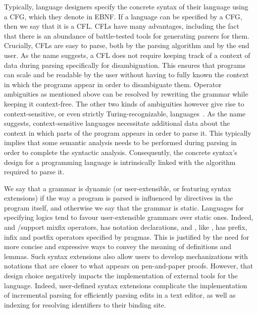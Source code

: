 

Typically, language designers specify the concrete syntax of their language using a \ac{CFG}, which they denote in \ac{EBNF}.
If a language can be specified by a \ac{CFG}, then we say that it is a \ac{CFL}.
\Acp{CFL} have many advantages, including the fact that there is an abundance of battle-tested tools for generating parsers for them.
Crucially, \acp{CFL} are easy to parse, both by the parsing algorithm and by the end user.
As the name suggests, a \ac{CFL} does not require keeping track of a context of data during parsing specifically for disambiguation.
This ensures that programs can scale and be readable by the user without having to fully known the context in which the programs appear in order to disambiguate them.
Operator ambiguities as mentioned above can be resolved by rewriting the grammar while keeping it context-free.
The other two kinds of ambiguities however give rise to context-sensitive, or even strictly Turing-recognizable, languages~\cite{chomsky1956three}.
As the name suggests, context-sensitive languages necessitate additional data about the context in which parts of the program appears in order to parse it.
This typically implies that some semantic analysis needs to be performed during parsing in order to complete the syntactic analysis.
Consequently, the concrete syntax's design for a programming language is intrinsically linked with the algorithm required to parse it.


We say that a grammar is dynamic (or user-extensible, or featuring syntax extensions) if the way a program is parsed is influenced by directives in the program itself, and otherwise we say that the grammar is static.
Languages for specifying logics tend to favour user-extensible grammars over static ones.
Indeed, \Agda and \Isabelle/\HOL support mixfix operators, \Coq has notation declarations, and \Beluga, like \Twelf, has prefix, infix and postfix operators specified by pragmas.
This is justified by the need for more concise and expressive ways to convey the meaning of definitions and lemmas.
Such syntax extensions also allow users to develop mechanizations with notations that are closer to what appears on pen-and-paper proofs.
However, that design choice negatively impacts the implementation of external tools for the language.
Indeed, user-defined syntax extensions complicate the implementation of incremental parsing for efficiently parsing edits in a text editor, as well as indexing for resolving identifiers to their binding site.

